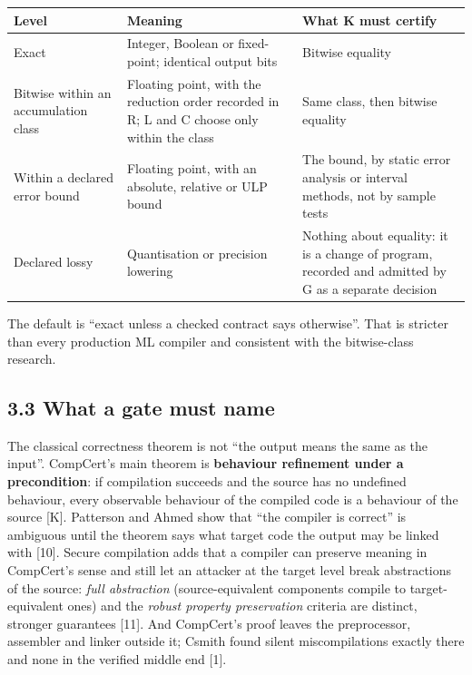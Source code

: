 \documentclass[10pt,letterpaper]{article}
\newcounter{none}
\begin{document}
{\footnotesize\setlength{\tabcolsep}{3.8pt}\renewcommand{\arraystretch}{1.15}
\begin{longtable}[]{@{}
  >{\raggedright\arraybackslash}p{}
  >{\raggedright\arraybackslash}p{}
  >{\raggedright\arraybackslash}p{}@{}}
\toprule\noalign{}
\begin{minipage}[b]{\linewidth}\raggedright
\textbf{Level}
\end{minipage} & \begin{minipage}[b]{\linewidth}\raggedright
\textbf{Meaning}
\end{minipage} & \begin{minipage}[b]{\linewidth}\raggedright
\textbf{What K must certify}
\end{minipage} \\
\midrule\noalign{}
\endhead
\bottomrule\noalign{}
\endlastfoot
Exact & Integer, Boolean or fixed-point; identical output bits & Bitwise
equality \\
Bitwise within an accumulation class & Floating point, with the
reduction order recorded in R; L and C choose only within the class &
Same class, then bitwise equality \\
Within a declared error bound & Floating point, with an absolute,
relative or ULP bound & The bound, by static error analysis or interval
methods, not by sample tests \\
Declared lossy & Quantisation or precision lowering & Nothing about
equality: it is a change of program, recorded and admitted by G as a
separate decision \\
\end{longtable}
}

The default is ``exact unless a checked contract says otherwise''. That
is stricter than every production ML compiler and consistent with the
bitwise-class research.

\subsection{3.3 What a gate must name}\label{what-a-gate-must-name}

The classical correctness theorem is not ``the output means the same as
the input''. CompCert's main theorem is \textbf{behaviour refinement
under a precondition}: if compilation succeeds and the source has no
undefined behaviour, every observable behaviour of the compiled code is
a behaviour of the source {[}K{]}. Patterson and Ahmed show that ``the
compiler is correct'' is ambiguous until the theorem says what target
code the output may be linked with {[}10{]}. Secure compilation adds
that a compiler can preserve meaning in CompCert's sense and still let
an attacker at the target level break abstractions of the source:
\emph{full abstraction} (source-equivalent components compile to
target-equivalent ones) and the \emph{robust property preservation}
criteria are distinct, stronger guarantees {[}11{]}. And CompCert's
proof leaves the preprocessor, assembler and linker outside it; Csmith
found silent miscompilations exactly there and none in the verified
middle end {[}1{]}.
\end{document}

